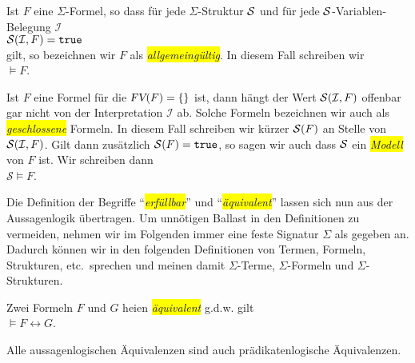 \begin{Definition}
    Ist $F$ eine $\Sigma$-Formel, so dass f\"{u}r jede $\Sigma$-Struktur $\mathcal{S}$ und f\"{u}r jede
    $\mathcal{S}$-Variablen-Belegung $\mathcal{I}$ \\[0.2cm]
    \hspace*{1.3cm} $\mathcal{S}(\mathcal{I}, F) = \mathtt{true}$ \\[0.2cm]
    gilt, so bezeichnen wir $F$ als \colorbox{yellow}{\emph{allgemeing\"{u}ltig}}.  In diesem Fall schreiben wir \\[0.2cm]
    \hspace*{1.3cm} $\models F$. 
    \eox
\end{Definition}

Ist $F$ eine Formel f\"{u}r die $\textsl{FV}(F) = \{\}$ ist, dann h\"{a}ngt der Wert $\mathcal{S}(\mathcal{I}, F)$
offenbar gar nicht von der Interpretation $\mathcal{I}$ ab.  Solche Formeln bezeichnen wir auch als 
\colorbox{yellow}{\emph{geschlossene}} Formeln.   In diesem Fall schreiben wir k\"{u}rzer  $\mathcal{S}(F)$
an Stelle von $\mathcal{S}(\mathcal{I}, F)$.  Gilt dann zus\"{a}tzlich $\mathcal{S}(F) = \mathtt{true}$, 
so sagen wir auch dass $\mathcal{S}$ ein \colorbox{yellow}{\emph{Modell}} von $F$ ist.  Wir schreiben dann \\[0.2cm]
\hspace*{1.3cm} $\mathcal{S} \models F$.
\vspace{0.1cm}

Die Definition der Begriffe ``\colorbox{yellow}{\emph{erf\"{u}llbar}}'' und
``\colorbox{yellow}{\emph{\"{a}quivalent}}'' lassen sich nun aus der Aussagenlogik \"{u}bertragen. 
Um unn\"{o}tigen Ballast in den Definitionen zu vermeiden, nehmen wir im Folgenden immer eine
feste Signatur $\Sigma$ als gegeben an.  Dadurch k\"{o}nnen wir in den folgenden Definitionen
von Termen, Formeln, Strukturen, etc.~sprechen und meinen damit  $\Sigma$-Terme,
$\Sigma$-Formeln und $\Sigma$-Strukturen.

\begin{Definition}[\"{a}quivalent]
  Zwei Formeln $F$ und $G$ hei\3en \colorbox{yellow}{\emph{\"{a}quivalent}} g.d.w. gilt \\[0.2cm]
  \hspace*{1.3cm} $\models F \leftrightarrow G$.
  \eox
\end{Definition}

\noindent
Alle aussagenlogischen \"{A}quivalenzen sind auch pr\"{a}dikatenlogische \"{A}quivalenzen.

